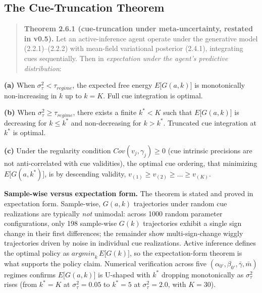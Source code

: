 \documentclass{article}
\begin{document}
\subsection{The Cue-Truncation
Theorem}\label{the-cue-truncation-theorem}

\begin{quote}
\textbf{Theorem 2.6.1 (cue-truncation under meta-uncertainty, restated
in v0.5).} Let an active-inference agent operate under the generative
model (2.2.1)--(2.2.2) with mean-field variational posterior (2.4.1),
integrating cues sequentially. Then in \emph{expectation under the
agent's predictive distribution}:
\end{quote}

\textbf{(a)} When \(\sigma_{\tau}^{2} < \tau_{regime}\), the expected
free energy \(E\lbrack G(a,k)\rbrack\) is monotonically non-increasing
in \(k\) up to \(k = K\). Full cue integration is optimal.

\textbf{(b)} When \(\sigma_{\tau}^{2} \geq \tau_{regime}\), there exists
a finite \(k^{*} < K\) such that \(E\lbrack G(a,k)\rbrack\) is
decreasing for \(k \leq k^{*}\) and non-decreasing for \(k > k^{*}\).
Truncated cue integration at \(k^{*}\) is optimal.

\textbf{(c)} Under the regularity condition
\(Cov(v_{j},\gamma_{j}) \geq 0\) (cue intrinsic precisions are not
anti-correlated with cue validities), the optimal cue ordering, that
minimizing \(E\lbrack G(a,k^{*})\rbrack\), is by descending validity,
\(v_{(1)} \geq v_{(2)} \geq \ldots \geq v_{(K)}\).

\textbf{Sample-wise versus expectation form.} The theorem is stated and
proved in expectation form. Sample-wise, \(G(a,k)\) trajectories under
random cue realizations are typically \emph{not} unimodal: across 1000
random parameter configurations, only 198 sample-wise \(G(k)\)
trajectories exhibit a single sign change in their first differences;
the remainder show multi-sign-change wiggly trajectories driven by noise
in individual cue realizations. Active inference defines the optimal
policy as \({argmin}_{k}\, E\lbrack G(k)\rbrack\), so the
expectation-form theorem is what supports the policy claim. Numerical
verification across five
\((\alpha_{0'},\beta_{0'},\bar{\gamma},\bar{m})\) regimes confirms
\(E\lbrack G(a,k)\rbrack\) is U-shaped with \(k^{*}\) dropping
monotonically as \(\sigma_{\tau}^{2}\) rises (from \(k^{*} = K\) at
\(\sigma_{\tau}^{2} = 0.05\) to \(k^{*} = 5\) at
\(\sigma_{\tau}^{2} = 2.0\), with \(K = 30\)).
\end{document}
